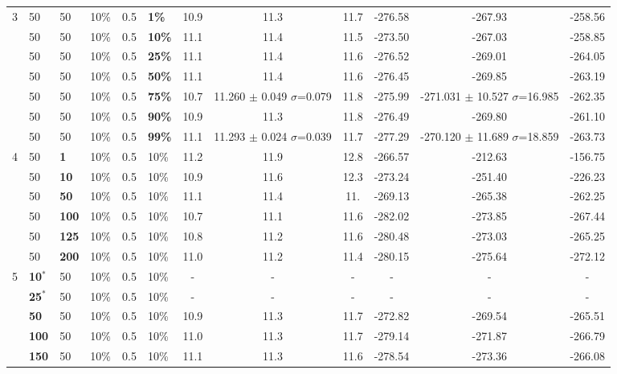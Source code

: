 \begin{sidewaystable}
\begin{tabular}{|l|l|l|l|l|l||c|c|c|c|c|c|}
    \hline
    3 & 50 & 50 & 10\% & 0.5 & \textbf{1\%} & 10.9 & 11.3 & 11.7 & -276.58 & -267.93 & -258.56 \\
    ~ & 50 & 50 & 10\% & 0.5 & \textbf{10\%} & 11.1 & 11.4 & 11.5 & -273.50 & -267.03 & -258.85 \\
    ~ & 50 & 50 & 10\% & 0.5 & \textbf{25\%} & 11.1 & 11.4 & 11.6 & -276.52 & -269.01 & -264.05 \\
    ~ & 50 & 50 & 10\% & 0.5 & \textbf{50\%} & 11.1 & 11.4 & 11.6 & -276.45 & -269.85 & -263.19 \\
    ~ & 50 & 50 & 10\% & 0.5 & \textbf{75\%} & 10.7 & 11.260 $\pm$ 0.049 $\sigma$=0.079 & 11.8 & -275.99 & -271.031 $\pm$ 10.527 $\sigma$=16.985 & -262.35 \\
    ~ & 50 & 50 & 10\% & 0.5 & \textbf{90\%} & 10.9 & 11.3 & 11.8 & -276.49 & -269.80 & -261.10 \\
    ~ & 50 & 50 & 10\% & 0.5 & \textbf{99\%} & 11.1 & 11.293 $\pm$ 0.024 $\sigma$=0.039 & 11.7 & -277.29 & -270.120 $\pm$ 11.689 $\sigma$=18.859 & -263.73 \\
    \hline
    4 & 50 & \textbf{1} & 10\% & 0.5 & 10\% &11.2 & 11.9 & 12.8 & -266.57 & -212.63 & -156.75 \\
    ~ & 50 & \textbf{10} & 10\% & 0.5 & 10\% & 10.9 & 11.6 & 12.3 & -273.24 & -251.40 & -226.23 \\
    ~ & 50 & \textbf{50} & 10\% & 0.5 & 10\% &  11.1 & 11.4 & 11. & -269.13 & -265.38 & -262.25 \\
    ~ & 50 & \textbf{100} & 10\% & 0.5 & 10\% & 10.7 & 11.1 & 11.6 & -282.02 & -273.85 & -267.44 \\
    ~ & 50 & \textbf{125} & 10\% & 0.5 & 10\% & 10.8 & 11.2 & 11.6 & -280.48 & -273.03 & -265.25 \\
    ~ & 50 & \textbf{200} & 10\% & 0.5 & 10\% & 11.0 & 11.2 & 11.4 & -280.15 & -275.64 & -272.12  \\
    \hline
    5 & \textbf{10$^*$} & 50 & 10\% & 0.5 & 10\% & - & - & - & - & - & - \\
    ~ & \textbf{25$^*$} & 50 & 10\% & 0.5 & 10\% & - & - & - & - & - & - \\
    ~ & \textbf{50} & 50 & 10\% & 0.5 & 10\% &10.9 & 11.3 & 11.7 & -272.82 & -269.54 & -265.51 \\
    ~ & \textbf{100} & 50 & 10\% & 0.5 & 10\% & 11.0 & 11.3 & 11.7 & -279.14 & -271.87 & -266.79 \\
    ~ & \textbf{150} & 50 & 10\% & 0.5 & 10\% & 11.1 & 11.3 & 11.6 & -278.54 & -273.36 & -266.08 \\

\end{tabular}
\end{sidewaystable}
